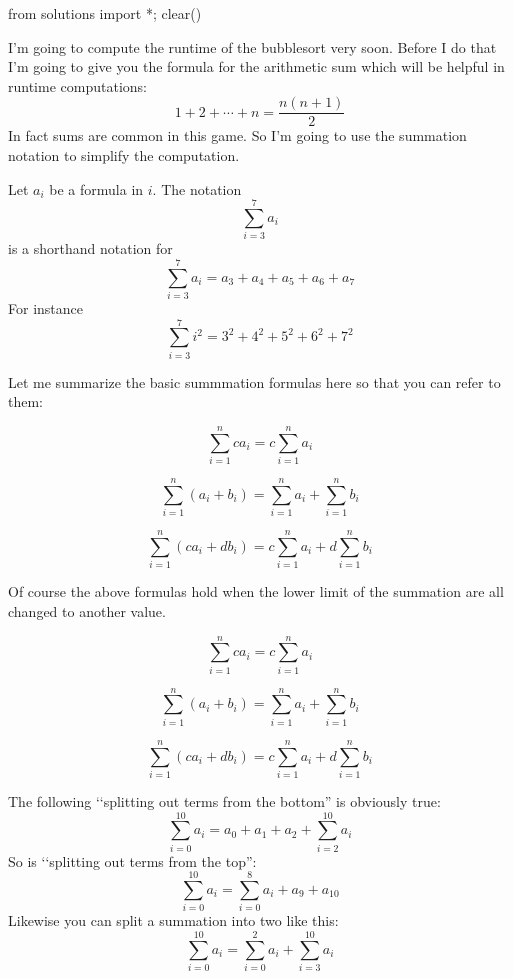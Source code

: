 \begin{python0}
from solutions import *; clear()
\end{python0}


I'm going to compute the runtime of the bubblesort very soon.
Before I do that I'm going to give you the formula for the arithmetic sum
which will be helpful in runtime computations:
\[
1 + 2 + \cdots + n = \frac{n(n+1)}{2}
\]
In fact sums are common in this game.
So I'm going to use the summation notation to simplify the computation.

Let $a_i$ be a formula in $i$.
The notation
\[
\sum_{i = 3}^7 a_i
\]
is a shorthand notation for 
\[
\sum_{i = 3}^7 a_i = a_3 + a_4 + a_5 + a_6 + a_7
\]
For instance
\[
\sum_{i = 3}^7 i^2 = 3^2 + 4^2 + 5^2 + 6^2 + 7^2
\]






\newpage

Let me summarize the basic summmation formulas here so that you can refer
to them:

\begin{prop}
  \mbox{}
  \begin{myenum}
  \item
    \[
    \sum_{i = 1}^n c a_i = c\sum_{i = 1}^n a_i
    \]
  \item
    \[
    \sum_{i = 1}^n (a_i + b_i) = \sum_{i = 1}^n a_i + \sum_{i=1}^n b_i
    \]
  \item
    \[
    \sum_{i = 1}^n (ca_i + db_i) = c\sum_{i = 1}^n a_i + d\sum_{i=1}^n b_i
    \]
  \end{myenum}
  Of course the above formulas hold when the lower limit of the summation
  are all changed to another value.
    \begin{myenum}
  \item
    \[
    \sum_{i = 1}^n c a_i = c\sum_{i = 1}^n a_i
    \]
  \item
    \[
    \sum_{i = 1}^n (a_i + b_i) = \sum_{i = 1}^n a_i + \sum_{i=1}^n b_i
    \]
  \item
    \[
    \sum_{i = 1}^n (ca_i + db_i) = c\sum_{i = 1}^n a_i + d\sum_{i=1}^n b_i
    \]
  \end{myenum}
\end{prop}

\newpage
The following \lq\lq splitting out terms from the bottom'' is obviously true:
\[
\sum_{i = 0}^{10} a_i = a_0 + a_1 + a_2 + \sum_{i = 2}^{10} a_i
\]
So is \lq\lq splitting out terms from the top'':
\[
\sum_{i = 0}^{10} a_i = \sum_{i = 0}^{8} a_i + a_9 + a_{10} 
\]
Likewise you can split a summation into two like this:
\[
\sum_{i = 0}^{10} a_i = \sum_{i=0}^2 a_i + \sum_{i=3}^{10} a_i
\]

